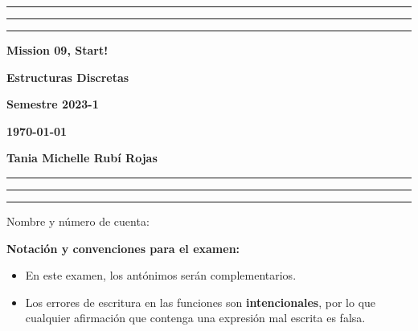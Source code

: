 \documentclass[12pt, a4paper]{exam}
\begin{document}
    \centering
    \hrule \hrule \hrule 
    \vspace{5mm}
    \begin{minipage}[c]{0.8\textwidth}
        \begin{center}
            {\large\textbf{Mission 09, Start!} \par
            \large \textbf{Estructuras Discretas} \par
            \large \textbf{Semestre 2023-1} \par
            \large \textbf{\today}	\par}
        \end{center}
    \end{minipage}

    \vspace{0.2in}
    \noindent
    \textbf{Tania Michelle Rubí Rojas}
    \vspace{2mm}
    \hrule \hrule \hrule 

    \vspace{5mm}
    \noindent
    Nombre y número de cuenta: \hrulefill\

    \textbf{Notación y convenciones para el examen:}
    {\tiny
    \begin{multicols}{2}
    \begin{itemize}\setlength\itemsep{0em}  
      \item En este examen, los antónimos serán complementarios.

      \item Los errores de escritura en las funciones son {\bf intencionales}, 
      por lo que cualquier afirmación que contenga una expresión mal escrita 
      es falsa.
    \end{itemize}
    \end{multicols}
    }
\end{document}
